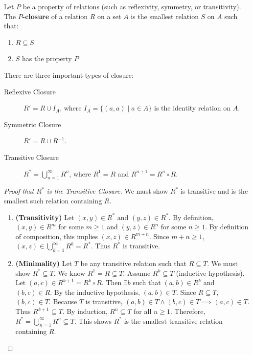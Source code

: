 \begin{definition}[Closure]
Let $P$ be a property of relations (such as reflexivity, symmetry, or transitivity). The \textbf{$P$-closure} of a relation $R$ on a set $A$ is the smallest relation $S$ on $A$ such that:
\begin{enumerate}
    \item $R \subseteq S$
    \item $S$ has the property $P$
\end{enumerate}
\end{definition}

There are three important types of closure:
\begin{description}
    \item[Reflexive Closure] $R' = R \cup I_A$, where $I_A = \{(a,a) \mid a \in A\}$ is the identity relation on $A$.
    \item[Symmetric Closure] $R' = R \cup R^{-1}$.
    \item[Transitive Closure] $R^* = \bigcup_{n=1}^\infty R^n$, where $R^1=R$ and $R^{n+1} = R^n \circ R$.
\end{description}

\begin{proof}[Proof that $R^*$ is the Transitive Closure]
We must show $R^*$ is transitive and is the smallest such relation containing $R$.
\begin{enumerate}
    \item \textbf{(Transitivity)}
    Let $(x,y) \in R^*$ and $(y,z) \in R^*$. By definition, $(x,y) \in R^m$ for some $m \ge 1$ and $(y,z) \in R^n$ for some $n \ge 1$.
    By definition of composition, this implies $(x,z) \in R^{m+n}$.
    Since $m+n \ge 1$, $(x,z) \in \bigcup_{k=1}^\infty R^k = R^*$.
    Thus $R^*$ is transitive.
    
    \item \textbf{(Minimality)}
    Let $T$ be any transitive relation such that $R \subseteq T$. We must show $R^* \subseteq T$.
    We know $R^1 = R \subseteq T$.
    Assume $R^k \subseteq T$ (inductive hypothesis).
    Let $(a,c) \in R^{k+1} = R^k \circ R$. Then $\exists b$ such that $(a,b) \in R^k$ and $(b,c) \in R$.
    By the inductive hypothesis, $(a,b) \in T$. Since $R \subseteq T$, $(b,c) \in T$.
    Because $T$ is transitive, $(a,b) \in T \wedge (b,c) \in T \implies (a,c) \in T$.
    Thus $R^{k+1} \subseteq T$.
    By induction, $R^n \subseteq T$ for all $n \ge 1$.
    Therefore, $R^* = \bigcup_{n=1}^\infty R^n \subseteq T$.
    This shows $R^*$ is the smallest transitive relation containing $R$.
\end{enumerate}
\end{proof}

